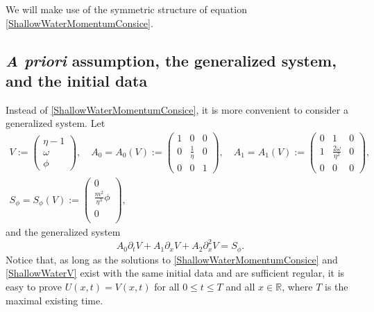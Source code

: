 \documentclass[reqno,11pt]{amsart}
\theoremstyle{plain}
\theoremstyle{definition}
\numberwithin{equation}{section}
\begin{document}
We will make use of the symmetric structure of equation \eqref{ShallowWaterMomentumConsice}. 



\subsection{\textit{A priori} assumption,  the generalized system, and the initial data}
\label{subsec:generalized-system-initial}

Instead of \eqref{ShallowWaterMomentumConsice},
it is more convenient to consider a generalized system.
Let
\begin{equation}
\label{Def:V}
\begin{gathered}
V:=\begin{pmatrix}
    \eta -1 \\
    \omega \\
    \phi
\end{pmatrix}, \quad A_0=A_0(V):=\begin{pmatrix}
    1 & 0 & 0 \\
    0 & \frac{1}{\eta} & 0 \\
    0 & 0 & 1
\end{pmatrix}, \quad A_1=A_1(V):=\begin{pmatrix}
    0 & 1 & 0 \\
    1 & \frac{2\omega}{\eta^2} & 0 \\
    0 & 0 & 0
\end{pmatrix},  \\
{S}_{\phi} = S_\phi(V):=\begin{pmatrix}
    0 \\
    \frac{m^2}{\eta^3}\phi \\
    0 \\
\end{pmatrix},
\end{gathered}
\end{equation}
and the generalized system
\begin{equation}
    \label{ShallowWaterV}
    A_0\partial_t V+A_1\partial_x V+A_2\partial_x^2 V={S}_{\phi}.
\end{equation}
Notice that, as long as the solutions to \eqref{ShallowWaterMomentumConsice} and \eqref{ShallowWaterV} exist with the same initial data and are sufficient regular, it is easy to prove $ U(x,t) = V(x,t) $ for all $ 0 \leq t \leq T $ and all $x\in\mathbb{R}$, where $ T $ is the maximal existing time.  
\end{document}
